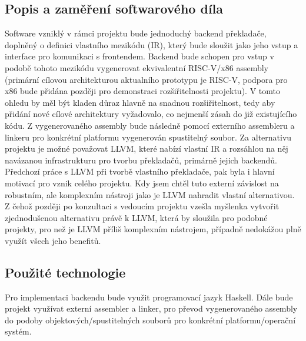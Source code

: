 \documentclass{article}
\def\xxx#1{\textcolor{red!50}{\itshape #1}}
\begin{document}
\subsection{Popis a zaměření softwarového díla}

Software vzniklý v rámci projektu bude jednoduchý backend překladače, doplněný o definici vlastního mezikódu (IR), který bude sloužit jako jeho vstup a interface pro komunikaci s frontendem. Backend bude schopen pro vstup v podobě tohoto mezikódu vygenerovat ekvivalentní RISC-V/x86 assembly (primární cílovou architekturou aktualního prototypu je RISC-V, podpora pro x86 bude přidána později pro demonstraci rozšiřitelnosti projektu). V tomto ohledu by měl být kladen důraz hlavně na snadnou rozšiřitelnost, tedy aby přidání nové cílové architektury vyžadovalo, co nejmenší zásah do již existujícího kódu. Z vygenerovaného assembly bude následně pomocí externího assembleru a linkeru pro konkrétní platformu vygenerován spustitelný soubor. Za alternativu projektu je možné považovat LLVM, které nabízí vlastní IR a rozsáhlou na něj navázanou infrastrukturu pro tvorbu překladačů, primárně jejich backendů. Předchozí práce s LLVM při tvorbě vlastního překladače, pak byla i hlavní motivací pro vznik celého projektu. Kdy jsem chtěl tuto externí závislost na robustním, ale komplexním nástroji jako je LLVM nahradit vlastní alternativou. Z čehož později po konzultaci s vedoucím projektu vzešla myšlenka vytvořit zjednodušenou alternativu právě k LLVM, která by sloužila pro podobné projekty, pro než je LLVM příliš komplexním nástrojem, případně nedokážou plně využít všech jeho benefitů.


\subsection{Použité technologie }

Pro implementaci backendu bude využit programovací jazyk Haskell. Dále bude projekt využívat externí assembler a linker, pro převod vygenerovaného assembly do podoby objektových/spustitelných souborů pro konkrétní platformu/operační systém. 

\end{document}
